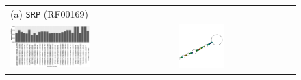 \documentclass[ twoside,openright,titlepage,numbers=noenddot,headinclude,%
                footinclude=false, cleardoublepage=empty,abstractoff, %
                BCOR=5mm,paper=a4,fontsize=11pt,%
                ngerman,american,%
                ]{scrreprt}
\begin{document}
\begin{figure}
\begin{tabular}{l|l}
(a) \texttt{SRP} (RF00169) \\
\includegraphics[width=0.5\textwidth]{./pictures/sequenceSimilarity/SRP.pdf} &
\includegraphics[width=0.4\textwidth]{./pictures/consensusStructure/SRP.pdf} \\


\end{tabular}
\end{figure}
\end{document}
